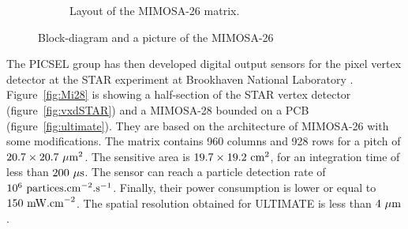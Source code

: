 \begin{figure}[!h]
\begin{subfigure}[t]{0.4\textwidth}
        \caption{Layout of the MIMOSA-26 matrix.}
        \label{fig:archMi26}
    \end{subfigure}
    \caption{Block-diagram and a picture of the MIMOSA-26}\label{fig:Mi26}
    \end{figure}    

    The PICSEL group has then developed digital output sensors for the pixel vertex detector at the STAR experiment at Brookhaven National Laboratory \cite{1748-0221-7-01-C01102}\cite{1748-0221-10-03-C03026}.
    Figure~\ref{fig:Mi28} is showing a half-section of the STAR vertex detector (figure~\ref{fig:vxdSTAR}) and a \gls{MIMOSA}-28 bounded on a PCB (figure~\ref{fig:ultimate}).
    They are based on the architecture of \gls{MIMOSA}-26 with some modifications.
    The matrix contains 960 columns and 928 rows for a pitch of $20.7 \times 20.7~\rm{\mu m}^2$.
    The sensitive area is $19.7 \times 19.2~\rm{cm}^2$, for an integration time of less than $200~\rm{\mu s}$.
    The sensor can reach a particle detection rate of $10^6~\rm{partices.cm}^{-2}\rm{.s}^{-1}$. 
    Finally, their power consumption is lower or equal to $150~\rm{mW.cm}^{-2}$.
    The spatial resolution obtained for ULTIMATE is less than $4~\rm{\mu m}$.

